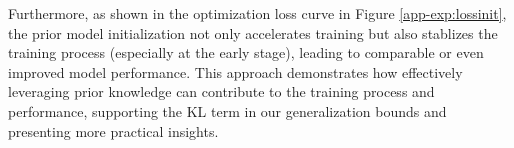 Furthermore, as shown in the optimization loss curve in Figure \ref{app-exp:lossinit}, the prior model initialization not only accelerates training but also stablizes the training process (especially at the early stage), leading to comparable or even improved model performance. This approach demonstrates how effectively leveraging prior knowledge can contribute to the training process and performance, supporting the KL term in our generalization bounds and presenting more practical insights.  